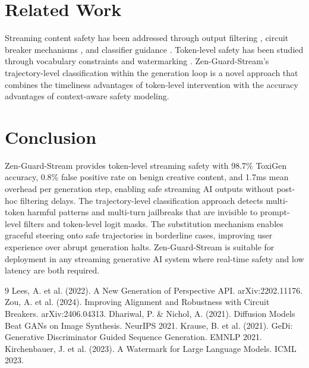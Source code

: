 \documentclass[11pt,a4paper]{article}
\begin{document}
\section{Related Work}

Streaming content safety has been addressed through output filtering \cite{perspective}, circuit breaker mechanisms \cite{circuitbreaker}, and classifier guidance \cite{classifierguidance}. Token-level safety has been studied through vocabulary constraints \cite{vocabconstraint} and watermarking \cite{watermark}. Zen-Guard-Stream's trajectory-level classification within the generation loop is a novel approach that combines the timeliness advantages of token-level intervention with the accuracy advantages of context-aware safety modeling.

\section{Conclusion}

Zen-Guard-Stream provides token-level streaming safety with 98.7\% ToxiGen accuracy, 0.8\% false positive rate on benign creative content, and 1.7ms mean overhead per generation step, enabling safe streaming AI outputs without post-hoc filtering delays. The trajectory-level classification approach detects multi-token harmful patterns and multi-turn jailbreaks that are invisible to prompt-level filters and token-level logit masks. The substitution mechanism enables graceful steering onto safe trajectories in borderline cases, improving user experience over abrupt generation halts. Zen-Guard-Stream is suitable for deployment in any streaming generative AI system where real-time safety and low latency are both required.

\begin{thebibliography}{9}
 Lees, A. et al. (2022). A New Generation of Perspective API. arXiv:2202.11176.
 Zou, A. et al. (2024). Improving Alignment and Robustness with Circuit Breakers. arXiv:2406.04313.
 Dhariwal, P. \& Nichol, A. (2021). Diffusion Models Beat GANs on Image Synthesis. NeurIPS 2021.
 Krause, B. et al. (2021). GeDi: Generative Discriminator Guided Sequence Generation. EMNLP 2021.
 Kirchenbauer, J. et al. (2023). A Watermark for Large Language Models. ICML 2023.
\end{thebibliography}
\end{document}
